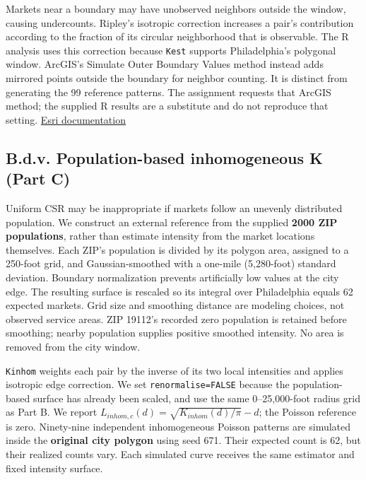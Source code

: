 \documentclass[
  10pt,
]{article}
\begin{document}
Markets near a boundary may have unobserved neighbors outside the
window, causing undercounts. Ripley's isotropic correction increases a
pair's contribution according to the fraction of its circular
neighborhood that is observable. The R analysis uses this correction
because \texttt{Kest} supports Philadelphia's polygonal window. ArcGIS's
Simulate Outer Boundary Values method instead adds mirrored points
outside the boundary for neighbor counting. It is distinct from
generating the 99 reference patterns. The assignment requests that
ArcGIS method; the supplied R results are a substitute and do not
reproduce that setting.
\href{https://pro.arcgis.com/en/pro-app/3.4/tool-reference/spatial-statistics/multi-distance-spatial-cluster-analysis.htm}{Esri
documentation}

\subsection{B.d.v. Population-based inhomogeneous K (Part
C)}\label{b.d.v.-population-based-inhomogeneous-k-part-c}

Uniform CSR may be inappropriate if markets follow an unevenly
distributed population. We construct an external reference from the
supplied \textbf{2000 ZIP populations}, rather than estimate intensity
from the market locations themselves. Each ZIP's population is divided
by its polygon area, assigned to a 250-foot grid, and Gaussian-smoothed
with a one-mile (5,280-foot) standard deviation. Boundary normalization
prevents artificially low values at the city edge. The resulting surface
is rescaled so its integral over Philadelphia equals 62 expected
markets. Grid size and smoothing distance are modeling choices, not
observed service areas. ZIP 19112's recorded zero population is retained
before smoothing; nearby population supplies positive smoothed
intensity. No area is removed from the city window.

\texttt{Kinhom} weights each pair by the inverse of its two local
intensities and applies isotropic edge correction. We set
\texttt{renormalise=FALSE} because the population-based surface has
already been scaled, and use the same 0--25,000-foot radius grid as Part
B. We report \(L_{inhom,c}(d)=\sqrt{K_{inhom}(d)/\pi}-d\); the Poisson
reference is zero. Ninety-nine independent inhomogeneous Poisson
patterns are simulated inside the \textbf{original city polygon} using
seed 671. Their expected count is 62, but their realized counts vary.
Each simulated curve receives the same estimator and fixed intensity
surface.
\end{document}
